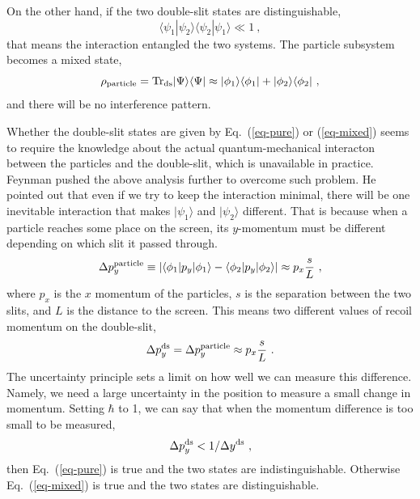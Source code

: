 \documentclass[aps,showpacs,twocolumn,floats,prd,superscriptaddress,nofootinbib]{revtex4-1}
\begin{document}
On the other hand, if the two double-slit states are distinguishable,
\begin{equation}
\langle\psi_1|\psi_2\rangle\langle\psi_2|\psi_1\rangle \ll 1~,
\label{eq-mixed}
\end{equation}
that means the interaction entangled the two systems. The particle subsystem becomes a mixed state,
\begin{equation}
\rho_{\rm particle} = {\rm Tr}_{\rm ds}|\Psi\rangle\langle\Psi| \approx
|\phi_1\rangle\langle\phi_1| + |\phi_2\rangle\langle\phi_2|~,
\end{equation}
and there will be no interference pattern.

Whether the double-slit states are given by Eq.~(\ref{eq-pure}) or (\ref{eq-mixed}) seems to require the knowledge about the actual quantum-mechanical interacton between the particles and the double-slit, which is unavailable in practice.
Feynman pushed the above analysis further to overcome such problem.
He pointed out that even if we try to keep the interaction minimal, there will be one inevitable interaction that makes $|\psi_1\rangle$ and $|\psi_2\rangle$ different.
That is because when a particle reaches some place on the screen, its $y$-momentum must be different depending on which slit it passed through.
\begin{equation}
\Delta p_y^{\rm particle} \equiv 
|\langle\phi_1|p_y|\phi_1\rangle - \langle\phi_2|p_y|\phi_2\rangle| 
\approx p_x \frac{s}{L}~,
\end{equation}
where $p_x$ is the $x$ momentum of the particles, $s$ is the separation between the two slits, and $L$ is the distance to the screen. 
This means two different values of recoil momentum on the double-slit,
\begin{equation}
\Delta p_y^{\rm ds} = \Delta p_y^{\rm particle} \approx p_x \frac{s}{L}~.
\label{eq-dpds}
\end{equation}
The uncertainty principle sets a limit on how well we can measure this difference. Namely, we need a large uncertainty in the position to measure a small change in momentum. Setting $\hbar$ to 1, we can say that when the momentum difference is too small to be measured,
\begin{equation}
\Delta p_y^{\rm ds} < 1/\Delta y^{\rm ds}~,
\label{eq-standard}
\end{equation} 
then Eq.~(\ref{eq-pure}) is true and the two states are indistinguishable. 
Otherwise Eq.~(\ref{eq-mixed}) is true and the two states are distinguishable.
\end{document}
